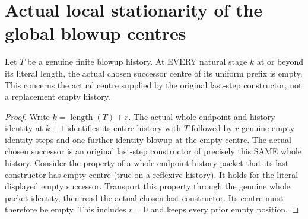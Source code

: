 \section{Actual local stationarity of the global blowup centres}

\begin{lemma}
\label{hir:sharp-actual-curve-local-successor-centre-empty}
\leanok
Let $T$ be a genuine finite blowup history. At EVERY natural stage $k$
at or beyond its literal length, the actual chosen successor centre of
its uniform prefix is empty. This concerns the actual centre supplied
by the original last-step constructor, not a replacement empty history.
\end{lemma}
\begin{proof}
Write $k=\operatorname{length}(T)+r$. The actual whole endpoint-and-history identity at $k+1$ identifies
its entire history with $T$ followed by $r$ genuine empty identity steps
and one further identity blowup at the empty centre. The actual chosen
successor is an original last-step constructor of precisely this SAME
whole history. Consider the property of a whole endpoint-history packet
that its last constructor has empty centre (true on a reflexive history).
It holds for the literal displayed empty successor. Transport this
property through the genuine whole packet identity, then read the actual
chosen last constructor. Its centre must therefore be empty. This includes $r=0$ and keeps every prior empty position.
\end{proof}

